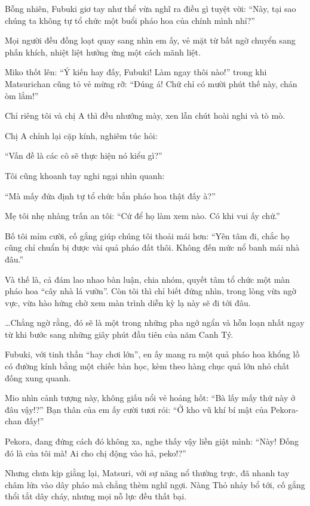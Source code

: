 \documentclass[../main.tex]{subfiles}
\begin{document}
Bỗng nhiên, Fubuki giơ tay như thể vừa nghĩ ra điều gì tuyệt vời: ``Này, tại sao chúng ta không tự tổ chức một buổi pháo hoa của chính mình nhỉ?''

Mọi người đều đồng loạt quay sang nhìn em ấy, vẻ mặt từ bất ngờ chuyển sang phấn khích, nhiệt liệt hưởng ứng một cách mãnh liệt.

Miko thốt lên: ``Ý kiến hay đấy, Fubuki! Làm ngay thôi nào!'' trong khi Matsurichan cũng tỏ vẻ mừng rỡ: ``Đúng á! Chứ chỉ có mười phút thế này, chán òm lắm!''

Chỉ riêng tôi và chị A thì đều nhướng mày, xen lẫn chút hoài nghi và tò mò.

Chị A chỉnh lại cặp kính, nghiêm túc hỏi:

``Vấn đề là các cô sẽ thực hiện nó kiểu gì?''

Tôi cũng khoanh tay nghi ngại nhìn quanh:

``Mà mấy đứa định tự tổ chức bắn pháo hoa thật đấy à?''

Mẹ tôi nhẹ nhàng trấn an tôi: ``Cứ để họ làm xem nào. Có khi vui ấy chứ.''

Bố tôi mỉm cười, cố gắng giúp chúng tôi thoải mái hơn: ``Yên tâm đi, chắc họ cũng chỉ chuẩn bị được vài quả pháo đất thôi. Không đến mức nổ banh mái nhà đâu.''

Và thế là, cả đám lao nhao bàn luận, chia nhóm, quyết tâm tổ chức một màn pháo hoa ``cây nhà lá vườn''. Còn tôi thì chỉ biết đứng nhìn, trong lòng vừa ngờ vực, vừa hào hứng chờ xem màn trình diễn kỳ lạ này sẽ đi tới đâu.

\dots Chẳng ngờ rằng, đó sẽ là một trong những pha ngớ ngẩn và hỗn loạn nhất ngay từ khi bước sang những giây phút đầu tiên của năm Canh Tý.

Fubuki, với tinh thần ``hay chơi lớn'', en ấy mang ra một quả pháo hoa khổng lồ có đường kính bằng một chiếc bàn học, kèm theo hàng chục quả lớn nhỏ chất đống xung quanh.

Mio nhìn cảnh tượng này, không giấu nổi vẻ hoảng hốt: ``Bà lấy mấy thứ này ở đâu vậy!?'' Bạn thân của em ấy cười tươi rói: ``Ở kho vũ khí bí mật của Pekora-chan đấy!''

Pekora, đang đứng cách đó không xa, nghe thấy vậy liền giật mình: ``Này! Đống đó là của tôi mà! Ai cho chị động vào hả, peko!?''

Nhưng chưa kịp giằng lại, Matsuri, với sự năng nổ thường trực, đã nhanh tay châm lửa vào dây pháo mà chẳng thèm nghĩ ngợi. Nàng Thỏ nhảy bổ tới, cố gắng thổi tắt dây cháy, nhưng mọi nỗ lực đều thất bại.
\end{document}
